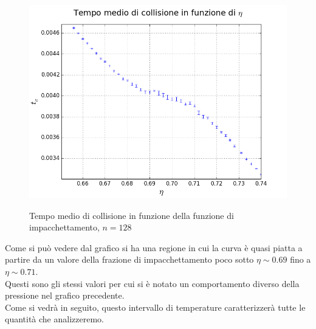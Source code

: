 \begin{center}
\begin{figure}
{		\includegraphics[scale=0.48]{sfere2D/tczoomzoom.png}
	}
\caption{Tempo medio di collisione in funzione della funzione di impacchettamento, $n=128$}
\end{figure}

\end{center}
Come si può vedere dal grafico si ha una regione in cui la curva è quasi piatta a partire da un valore della frazione di impacchettamento poco sotto $\eta \sim 0.69$ fino a $\eta \sim 0.71$.\\
Questi sono gli stessi valori per cui si è notato un comportamento diverso della pressione nel grafico precedente.\\
Come si vedrà in seguito, questo intervallo di temperature caratterizzerà tutte le quantità che analizzeremo.
 
